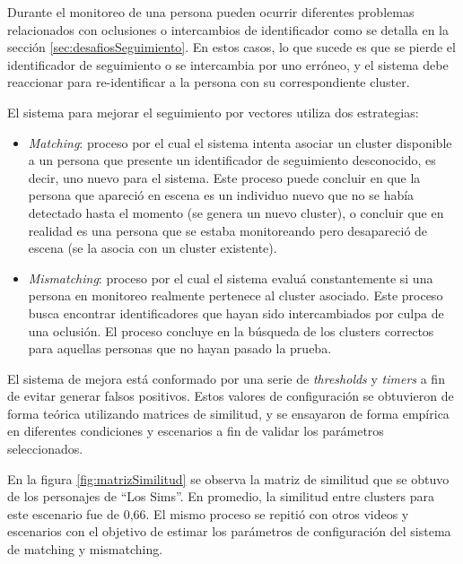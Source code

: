 Durante el monitoreo de una persona pueden ocurrir diferentes problemas relacionados con oclusiones o intercambios de identificador como se detalla en la sección \ref{sec:desafiosSeguimiento}. En estos casos, lo que sucede es que se pierde el identificador de seguimiento o se intercambia por uno erróneo, y el sistema debe reaccionar para re-identificar a la persona con su correspondiente cluster. 

\newpage

El sistema para mejorar el seguimiento por vectores utiliza dos estrategias:
\begin{itemize}
\item \textit{Matching}: proceso por el cual el sistema intenta asociar un cluster disponible a un persona que presente un identificador de seguimiento desconocido, es decir, uno nuevo para el sistema. Este proceso puede concluir en que la persona que apareció en escena es un individuo nuevo que no se había detectado hasta el momento (se genera un nuevo cluster), o concluir que en realidad es una persona que se estaba monitoreando pero desapareció de escena (se la asocia con un cluster existente).
\item \textit{Mismatching}: proceso por el cual el sistema evaluá constantemente si una persona en monitoreo realmente pertenece al cluster asociado. Este proceso busca encontrar identificadores que hayan sido intercambiados por culpa de una oclusión. El proceso concluye en la búsqueda de los clusters correctos para aquellas personas que no hayan pasado la prueba.
\end{itemize}

El sistema de mejora está conformado por una serie de \textit{thresholds} y \textit{timers} a fin de evitar generar falsos positivos. Estos valores de configuración se obtuvieron de forma teórica utilizando matrices de similitud, y se ensayaron de forma empírica en diferentes condiciones y escenarios a fin de validar los parámetros seleccionados.

En la figura \ref{fig:matrizSimilitud} se observa la matriz de similitud que se obtuvo de los personajes de ``Los Sims''. En promedio, la similitud entre clusters para este escenario fue de 0,66. El mismo proceso se repitió con otros videos y escenarios con el objetivo de estimar los parámetros de configuración del sistema de matching y mismatching.


